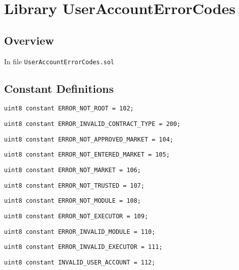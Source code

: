 
\chapter{Library UserAccountErrorCodes}

\minitoc

\section{Overview}


In file {\tt UserAccountErrorCodes.sol}

\section{Constant Definitions}


\begin{lstlisting}[firstnumber=4]
    uint8 constant ERROR_NOT_ROOT = 102;
\end{lstlisting}

\begin{lstlisting}[firstnumber=6]
    uint8 constant ERROR_INVALID_CONTRACT_TYPE = 200;
\end{lstlisting}

\begin{lstlisting}[firstnumber=8]
    uint8 constant ERROR_NOT_APPROVED_MARKET = 104; 
\end{lstlisting}

\begin{lstlisting}[firstnumber=9]
    uint8 constant ERROR_NOT_ENTERED_MARKET = 105;
\end{lstlisting}

\begin{lstlisting}[firstnumber=11]
    uint8 constant ERROR_NOT_MARKET = 106;
\end{lstlisting}

\begin{lstlisting}[firstnumber=12]
    uint8 constant ERROR_NOT_TRUSTED = 107;
\end{lstlisting}

\begin{lstlisting}[firstnumber=13]
    uint8 constant ERROR_NOT_MODULE = 108;
\end{lstlisting}

\begin{lstlisting}[firstnumber=14]
    uint8 constant ERROR_NOT_EXECUTOR = 109;
\end{lstlisting}

\begin{lstlisting}[firstnumber=15]
    uint8 constant ERROR_INVALID_MODULE = 110;
\end{lstlisting}

\begin{lstlisting}[firstnumber=16]
    uint8 constant ERROR_INVALID_EXECUTOR = 111;
\end{lstlisting}

\begin{lstlisting}[firstnumber=17]
    uint8 constant INVALID_USER_ACCOUNT = 112;
\end{lstlisting}
